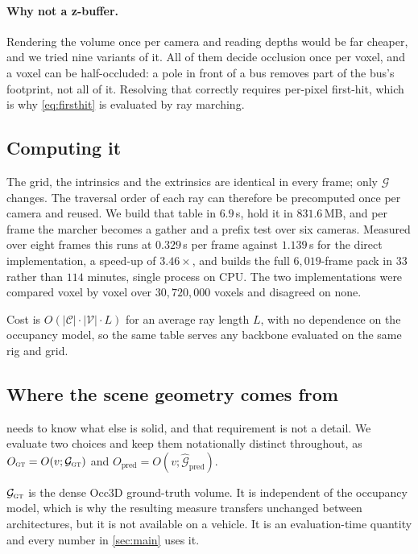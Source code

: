 \documentclass[10pt,twocolumn,letterpaper]{article}
\begin{document}
\paragraph{Why not a z-buffer.}
Rendering the volume once per camera and reading depths would be far
cheaper, and we tried nine variants of it. All of them decide occlusion
once per voxel, and a voxel can be half-occluded: a pole in front of a bus
removes part of the bus's footprint, not all of it. Resolving that
correctly requires per-pixel first-hit, which is why \cref{eq:firsthit} is
evaluated by ray marching.

\subsection{Computing it}
\label{sec:compute}
The grid, the intrinsics and the extrinsics are identical in every frame;
only $\mathcal{G}$ changes. The traversal order of each ray can therefore
be precomputed once per camera and reused. We build that table in
$6.9$\,s, hold it in $831.6$\,MB, and per frame the marcher becomes a
gather and a prefix test over six cameras. Measured over eight frames this
runs at $0.329$\,s per frame against $1.139$\,s for the direct
implementation, a speed-up of $3.46\times$, and builds the full
$6{,}019$-frame pack in $33$ rather than $114$ minutes, single process on
CPU. The two implementations were compared voxel by voxel over
$30{,}720{,}000$ voxels and disagreed on none.

Cost is $O(|\mathcal{C}|\cdot|\mathcal{V}|\cdot L)$ for an average ray
length $L$, with no dependence on the occupancy model, so the same table
serves any backbone evaluated on the same rig and grid.

\subsection{Where the scene geometry comes from}
\label{sec:source}
 needs to know what else is solid, and that requirement
is not a detail. We evaluate two choices and keep them notationally
distinct throughout, as $O_{\textsc{gt}} = O(v;\mathcal{G}_{\textsc{gt}})$
and $O_{\text{pred}} = O(v;\hat{\mathcal{G}}_{\text{pred}})$.

$\mathcal{G}_{\textsc{gt}}$ is the dense Occ3D ground-truth volume. It is
independent of the occupancy model, which is why the resulting measure
transfers unchanged between architectures, but it is not available on a
vehicle. It is an evaluation-time quantity and every number in
\cref{sec:main} uses it.
\end{document}
